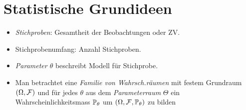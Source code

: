 \section*{Statistische Grundideen}%
\label{sec:statistische_grundideen}
		
\begin{itemize}
	\item \emph{Stichproben}: Gesamtheit der Beobachtungen oder ZV.
	\item Stichprobenumfang: Anzahl Stichproben.
	\item \emph{Parameter $\theta$} beschreibt Modell für Stichprobe.
	\item Man betrachtet eine \emph{Familie von Wahrsch.räumen} mit festem Grundraum $(\Omega, \mathcal{F})$ und für jedes
		$\theta$ aus dem \emph{Parameterraum} $\Theta$ ein Wahrscheinlichkeitsmass $\mathbb{P}_\theta$ um $(\Omega, \mathcal{F} ,
		\mathbb{P}_\theta)$ zu bilden
\end{itemize}
